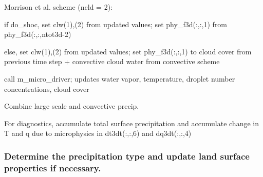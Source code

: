 \begin{DoxyItemize}
\begin{DoxyItemize}
\begin{DoxyItemize}
\end{DoxyItemize}
\end{DoxyItemize}
\item Morrison et al. scheme (ncld = 2)\+:
\begin{DoxyItemize}
\item if \textquotesingle{}do\+\_\+shoc\textquotesingle{}, set clw(1),(2) from updated values; set phy\+\_\+f3d(\+:,\+:,1) from phy\+\_\+f3d(\+:,\+:,ntot3d-\/2)
\item else, set clw(1),(2) from updated values; set phy\+\_\+f3d(\+:,\+:,1) to cloud cover from previous time step + convective cloud water from convective scheme
\item call \textquotesingle{}m\+\_\+micro\+\_\+driver\textquotesingle{}; updates water vapor, temperature, droplet number concentrations, cloud cover
\end{DoxyItemize}
\item Combine large scale and convective precip.
\item For diagnostics, accumulate total surface precipitation and accumulate change in T and q due to microphysics in dt3dt(\+:,\+:,6) and dq3dt(\+:,\+:,4)
\end{DoxyItemize}

\subsubsection*{Determine the precipitation type and update land surface properties if necessary.}


